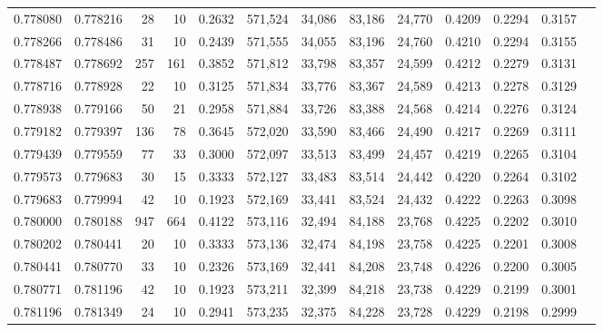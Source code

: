 \begin{tabular}{rrrrrrrrrrrrr}
0.778080 & 0.778216 &    28 &  10 &                                     0.2632 & 571,524 &  34,086 &  83,186 &  24,770 & 0.4209 & 0.2294 & 0.3157 \\
0.778266 & 0.778486 &    31 &  10 &                                     0.2439 & 571,555 &  34,055 &  83,196 &  24,760 & 0.4210 & 0.2294 & 0.3155 \\
0.778487 & 0.778692 &   257 & 161 &                                     0.3852 & 571,812 &  33,798 &  83,357 &  24,599 & 0.4212 & 0.2279 & 0.3131 \\
0.778716 & 0.778928 &    22 &  10 &                                     0.3125 & 571,834 &  33,776 &  83,367 &  24,589 & 0.4213 & 0.2278 & 0.3129 \\
0.778938 & 0.779166 &    50 &  21 &                                     0.2958 & 571,884 &  33,726 &  83,388 &  24,568 & 0.4214 & 0.2276 & 0.3124 \\
0.779182 & 0.779397 &   136 &  78 &                                     0.3645 & 572,020 &  33,590 &  83,466 &  24,490 & 0.4217 & 0.2269 & 0.3111 \\
0.779439 & 0.779559 &    77 &  33 &                                     0.3000 & 572,097 &  33,513 &  83,499 &  24,457 & 0.4219 & 0.2265 & 0.3104 \\
0.779573 & 0.779683 &    30 &  15 &                                     0.3333 & 572,127 &  33,483 &  83,514 &  24,442 & 0.4220 & 0.2264 & 0.3102 \\
0.779683 & 0.779994 &    42 &  10 &                                     0.1923 & 572,169 &  33,441 &  83,524 &  24,432 & 0.4222 & 0.2263 & 0.3098 \\
0.780000 & 0.780188 &   947 & 664 &                                     0.4122 & 573,116 &  32,494 &  84,188 &  23,768 & 0.4225 & 0.2202 & 0.3010 \\
0.780202 & 0.780441 &    20 &  10 &                                     0.3333 & 573,136 &  32,474 &  84,198 &  23,758 & 0.4225 & 0.2201 & 0.3008 \\
0.780441 & 0.780770 &    33 &  10 &                                     0.2326 & 573,169 &  32,441 &  84,208 &  23,748 & 0.4226 & 0.2200 & 0.3005 \\
0.780771 & 0.781196 &    42 &  10 &                                     0.1923 & 573,211 &  32,399 &  84,218 &  23,738 & 0.4229 & 0.2199 & 0.3001 \\
0.781196 & 0.781349 &    24 &  10 &                                     0.2941 & 573,235 &  32,375 &  84,228 &  23,728 & 0.4229 & 0.2198 & 0.2999 \\

\end{tabular}
